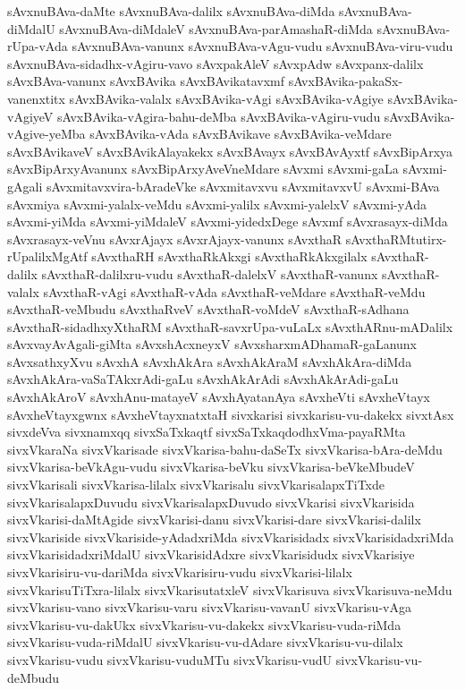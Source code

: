{sAvxnuBAva-daMte
sAvxnuBAva-dalilx
sAvxnuBAva-diMda
sAvxnuBAva-diMdalU
sAvxnuBAva-diMdaleV
sAvxnuBAva-parAmashaR-diMda
sAvxnuBAva-rUpa-vAda
sAvxnuBAva-vanunx
sAvxnuBAva-vAgu-vudu
sAvxnuBAva-viru-vudu
sAvxnuBAva-sidadhx-vAgiru-vavo
sAvxpakAleV
sAvxpAdw
sAvxpanx-dalilx
sAvxBAva-vanunx
sAvxBAvika
sAvxBAvikatavxmf
sAvxBAvika-pakaSx-vanenxtitx
sAvxBAvika-valalx
sAvxBAvika-vAgi
sAvxBAvika-vAgiye
sAvxBAvika-vAgiyeV
sAvxBAvika-vAgira-bahu-deMba
sAvxBAvika-vAgiru-vudu
sAvxBAvika-vAgive-yeMba
sAvxBAvika-vAda
sAvxBAvikave
sAvxBAvika-veMdare
sAvxBAvikaveV
sAvxBAvikAlayakekx
sAvxBAvayx
sAvxBAvAyxtf
sAvxBipArxya
sAvxBipArxyAvanunx
sAvxBipArxyAveVneMdare
sAvxmi
sAvxmi-gaLa
sAvxmi-gAgali
sAvxmitavxvira-bAradeVke
sAvxmitavxvu
sAvxmitavxvU
sAvxmi-BAva
sAvxmiya
sAvxmi-yalalx-veMdu
sAvxmi-yalilx
sAvxmi-yalelxV
sAvxmi-yAda
sAvxmi-yiMda
sAvxmi-yiMdaleV
sAvxmi-yidedxDege
sAvxmf
sAvxrasayx-diMda
sAvxrasayx-veVnu
sAvxrAjayx
sAvxrAjayx-vanunx
sAvxthaR
sAvxthaRMtutirx-rUpalilxMgAtf
sAvxthaRH
sAvxthaRkAkxgi
sAvxthaRkAkxgilalx
sAvxthaR-dalilx
sAvxthaR-dalilxru-vudu
sAvxthaR-dalelxV
sAvxthaR-vanunx
sAvxthaR-valalx
sAvxthaR-vAgi
sAvxthaR-vAda
sAvxthaR-veMdare
sAvxthaR-veMdu
sAvxthaR-veMbudu
sAvxthaRveV
sAvxthaR-voMdeV
sAvxthaR-sAdhana
sAvxthaR-sidadhxyXthaRM
sAvxthaR-savxrUpa-vuLaLx
sAvxthARnu-mADalilx
sAvxvayAvAgali-giMta
sAvxshAcxneyxV
sAvxsharxmADhamaR-gaLanunx
sAvxsathxyXvu
sAvxhA
sAvxhAkAra
sAvxhAkAraM
sAvxhAkAra-diMda
sAvxhAkAra-vaSaTAkxrAdi-gaLu
sAvxhAkArAdi
sAvxhAkArAdi-gaLu
sAvxhAkAroV
sAvxhAnu-matayeV
sAvxhAyatanAya
sAvxheVti
sAvxheVtayx
sAvxheVtayxgwnx
sAvxheVtayxnatxtaH
sivxkarisi
sivxkarisu-vu-dakekx
sivxtAsx
sivxdeVva
sivxnamxqq
sivxSaTxkaqtf
sivxSaTxkaqdodhxVma-payaRMta
sivxVkaraNa
sivxVkarisade
sivxVkarisa-bahu-daSeTx
sivxVkarisa-bAra-deMdu
sivxVkarisa-beVkAgu-vudu
sivxVkarisa-beVku
sivxVkarisa-beVkeMbudeV
sivxVkarisali
sivxVkarisa-lilalx
sivxVkarisalu
sivxVkarisalapxTiTxde
sivxVkarisalapxDuvudu
sivxVkarisalapxDuvudo
sivxVkarisi
sivxVkarisida
sivxVkarisi-daMtAgide
sivxVkarisi-danu
sivxVkarisi-dare
sivxVkarisi-dalilx
sivxVkariside
sivxVkariside-yAdadxriMda
sivxVkarisidadx
sivxVkarisidadxriMda
sivxVkarisidadxriMdalU
sivxVkarisidAdxre
sivxVkarisidudx
sivxVkarisiye
sivxVkarisiru-vu-dariMda
sivxVkarisiru-vudu
sivxVkarisi-lilalx
sivxVkarisuTiTxra-lilalx
sivxVkarisutatxleV
sivxVkarisuva
sivxVkarisuva-neMdu
sivxVkarisu-vano
sivxVkarisu-varu
sivxVkarisu-vavanU
sivxVkarisu-vAga
sivxVkarisu-vu-dakUkx
sivxVkarisu-vu-dakekx
sivxVkarisu-vuda-riMda
sivxVkarisu-vuda-riMdalU
sivxVkarisu-vu-dAdare
sivxVkarisu-vu-dilalx
sivxVkarisu-vudu
sivxVkarisu-vuduMTu
sivxVkarisu-vudU
sivxVkarisu-vu-deMbudu
}
